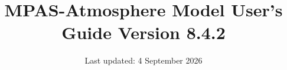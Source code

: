 \documentclass[11pt]{report}
\newcommand{\version}{8.4.2}
\begin{document}
\title{\bf \hfil MPAS-Atmosphere Model User's Guide \hfil \break \hfil \break Version \version}
\date{Last updated: 4 September 2026}


\maketitle



\tableofcontents











\appendix






\end{document}
